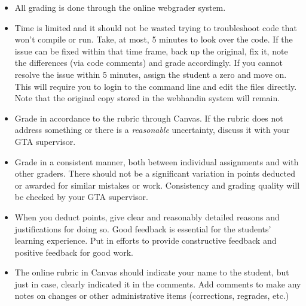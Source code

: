 \documentclass[12pt]{scrartcl}
\begin{document}
\begin{itemize}
  \item All grading is done through the online webgrader system.  
  \item Time is limited and it should not be wasted trying to troubleshoot 
    code that won't compile or run.  Take, at most, 5 minutes to look over
    the code.  If the issue can be fixed within that time frame, back up the
    original, fix it, note the differences (via code comments) and grade 
    accordingly.  If you cannot resolve the issue within 5 minutes, assign
    the student a zero and move on.  This will require you to login to the
    command line and edit the files directly.  Note that the original copy
    stored in the webhandin system will remain.
  \item Grade in accordance to the rubric through Canvas.  If the rubric 
    does not address something or there is a \emph{reasonable} uncertainty, 
    discuss it with your GTA supervisor.
  \item Grade in a consistent manner, both between individual assignments and
    with other graders.  There should not be a significant variation in
    points deducted or awarded for similar mistakes or work.  Consistency 
    and grading quality will be checked by your GTA supervisor.
  \item When you deduct points, give clear and reasonably detailed reasons
    and justifications for doing so.  Good feedback is essential for the
    students' learning experience.  Put in efforts to provide constructive
    feedback and positive feedback for good work.
  \item The online rubric in Canvas should indicate your name to the student, 
    but just in case, clearly indicated it in the comments.  Add comments to
    make any notes on changes or other administrative items (corrections, 
    regrades, etc.)
\end{itemize}
\end{document}
